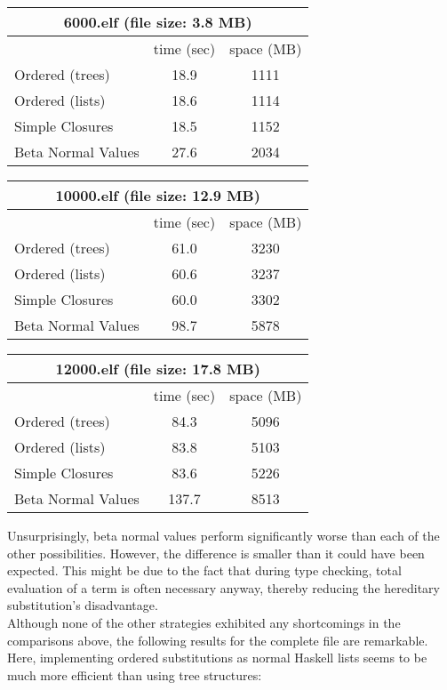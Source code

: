 \documentclass[submission,copyright,creativecommons]{eptcs}
\begin{document}
\begin{center}
\begin{tabular}{| l || c | c |}
\multicolumn{3}{c}{\textsf{6000.elf} (file size: 3.8 MB)}\\
\hline
& time (sec) & space (MB) \\
\hline
\hline
Ordered (trees) & 18.9 & 1111 \\
\hline
Ordered (lists) & 18.6 & 1114\\
\hline
Simple Closures & 18.5 & 1152\\
\hline
Beta Normal Values & 27.6 & 2034\\
\hline
\end{tabular}

\vspace{5pt}

\begin{tabular}{| l || c | c |}
\multicolumn{3}{c}{\textsf{10000.elf} (file size: 12.9 MB)}\\
\hline
& time (sec) & space (MB) \\
\hline
\hline
Ordered (trees) & 61.0 & 3230\\
\hline
Ordered (lists) & 60.6 & 3237\\
\hline
Simple Closures & 60.0 & 3302\\
\hline
Beta Normal Values & 98.7 & 5878\\
\hline
\end{tabular}

\vspace{5pt}

\begin{tabular}{| l || c | c |}
\multicolumn{3}{c}{\textsf{12000.elf} (file size: 17.8 MB)}\\
\hline
& time (sec) & space (MB) \\
\hline
\hline
Ordered (trees) & 84.3 & 5096 \\
\hline
Ordered (lists) & 83.8 & 5103 \\
\hline
Simple Closures & 83.6 & 5226 \\
\hline
Beta Normal Values & 137.7 & 8513 \\
\hline
\end{tabular}
\end{center}
Unsurprisingly, beta normal values perform significantly worse than each of the other possibilities. However, the difference is smaller than it could have been expected. This might be due to the fact that during type checking, total evaluation of a term is often necessary anyway, thereby reducing the hereditary substitution's disadvantage. \\
Although none of the other strategies exhibited any shortcomings in the comparisons above, the following results for the complete file are remarkable. Here, implementing ordered substitutions as normal Haskell lists seems to be much more efficient than using tree structures: 
\end{document}
